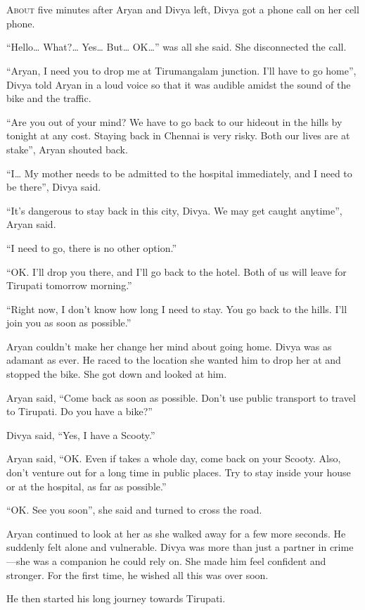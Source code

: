 \chapter{}

\lettrine{A}{bout} five minutes after Aryan and Divya left, Divya got a phone
call on her cell phone.

“Hello… What?… Yes… But… OK…” was all she said. She
disconnected the call.

“Aryan, I need you to drop me at Tirumangalam junction. I'll have to go home”,
Divya told Aryan in a loud voice so that it was audible amidst the sound of
the bike and the traffic.

“Are you out of your mind? We have to go back to our hideout in the hills by
tonight at any cost. Staying back in Chennai is very risky. Both our lives are
at stake”, Aryan shouted back.

“I… My mother needs to be admitted to the hospital immediately, and I need
to be there”, Divya said.

“It's dangerous to stay back in this city, Divya. We may get caught anytime”,
Aryan said.

“I need to go, there is no other option.”

“OK. I'll drop you there, and I'll go back to the hotel. Both of us will leave for
Tirupati tomorrow morning.”

“Right now, I don't know how long I need to stay. You go back to the hills. I'll
join you as soon as possible.”

Aryan couldn't make her change her mind about going home. Divya was as adamant as ever. He
raced to the location she wanted him to drop her at and stopped the bike. She got
down and looked at him.

Aryan said, “Come back as soon as possible. Don't use public transport to travel
to Tirupati. Do you have a bike?”

Divya said, “Yes, I have a Scooty.”

Aryan said, “OK. Even if takes a whole day, come back on your Scooty. Also, don't venture out for a long
time in public places. Try to stay inside your house or at the hospital, as
far as possible.”

“OK. See you soon”, she said and turned to cross the road.

Aryan continued to look at her as she walked away for a few more seconds. He
suddenly felt alone and vulnerable. Divya was more than just a partner in
crime—she was a companion he could rely on. She made him feel confident and
stronger. For the first time, he wished all this was over soon.

He then started his long journey towards Tirupati.
